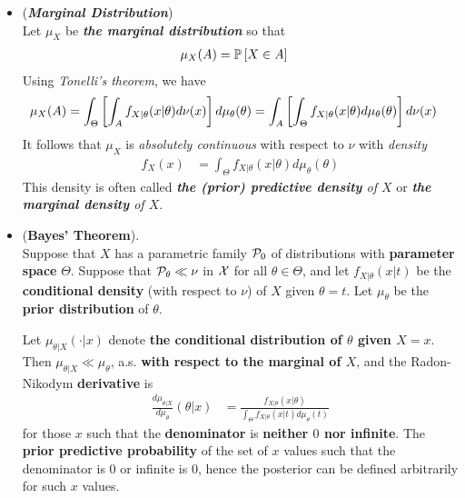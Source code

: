 \documentclass[11pt]{article}
\begin{document}
\begin{itemize}
\item \begin{definition} (\emph{\textbf{Marginal Distribution}})  \citep{schervish2012theory}\\
Let $\mu_{X}$ be \emph{\textbf{the marginal distribution}} so that 
\begin{align*}
\mu_{X}(A) &= {\mathbb P}\left[X \in A\right]
\end{align*} Using \emph{Tonelli's theorem}, we have
\begin{align*}
\mu_{X}(A) &= \int_{\Theta} \left[\int_{A}f_{X|\theta}(x|\theta) d\nu(x)\right] d\mu_{\theta}(\theta) = \int_{A}  \left[\int_{\Theta} f_{X|\theta}(x|\theta)d\mu_{\theta}(\theta)\right]d\nu(x) 
\end{align*} It follows that $\mu_{X}$ is \emph{absolutely continuous} with respect to $\nu$ with \emph{density}
\begin{align*}
f_{X}(x) &= \int_{\Theta} f_{X|\theta}(x|\theta)d\mu_{\theta}(\theta)
\end{align*} This density is often called \emph{\textbf{the (prior) predictive density} of $X$} or \emph{\textbf{the marginal density} of $X$}.
\end{definition}

\item \begin{theorem} (\textbf{Bayes' Theorem}).  \citep{schervish2012theory}\\
Suppose that $X$ has a parametric family ${\mathcal P}_{0}$ of distributions with \textbf{parameter space} $\Theta$. Suppose that ${\mathcal P}_{\theta} \ll \nu$ in ${\mathcal X}$ for all $\theta \in \Theta$, and let $f_{X|\theta}(x|t)$ be the \textbf{conditional density} (with respect to $\nu$) of $X$ given $\theta = t$. Let $\mu_{\theta}$ be the \textbf{prior distribution} of $\theta$. 

Let $\mu_{\theta|X}(\cdot | x)$ denote \textbf{the conditional distribution of $\theta$ given $X = x$}. Then $\mu_{\theta|X} \ll \mu_{\theta}$, a.s. \textbf{with respect to the marginal of $X$}, and the Radon-Nikodym \textbf{derivative} is
\begin{align}
\frac{d\mu_{\theta|X}}{d\mu_{\theta}}(\theta | x) &= \frac{f_{X|\theta}(x|\theta)}{ \int_{\Theta} f_{X|\theta}(x|t)d\mu_{\theta}(t)}  \label{eqn: Bayes_theorem}
\end{align} for those $x$ such that the \textbf{denominator} is \textbf{neither $0$ nor infinite}. The \textbf{prior predictive probability} of the set of $x$ values such that the denominator is $0$ or infinite is $0$, hence the posterior can be defined arbitrarily for such $x$ values.
\end{theorem}


\end{itemize}
\end{document}
